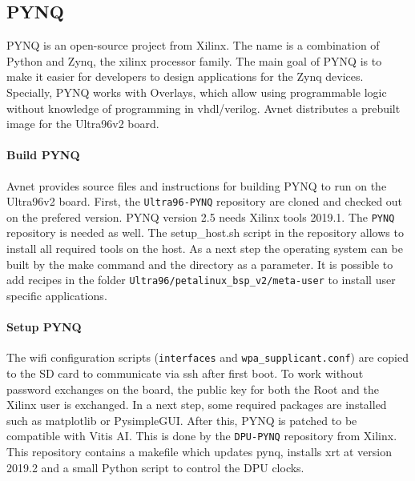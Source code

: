 \subsection{PYNQ}
\label{subsec:embedded_platform:operating_systems:pynq}

PYNQ is an open-source project from Xilinx.
The name is a combination of Python and Zynq, the xilinx processor family.
The main goal of PYNQ is to make it easier for developers to design applications for the Zynq devices. 
Specially, PYNQ works with Overlays, which allow using programmable logic without knowledge of programming in vhdl/verilog.
Avnet distributes a prebuilt image for the Ultra96v2 board.

\paragraph{Build PYNQ}
Avnet provides source files and instructions for building PYNQ to run on the Ultra96v2 board.
First, the \texttt{Ultra96-PYNQ} repository are cloned and checked out on the prefered version.
PYNQ version 2.5 needs Xilinx tools 2019.1.
The \texttt{PYNQ} repository is needed as well.
The setup\_host.sh script in the repository allows to install all required tools on the host.
As a next step the operating system can be built by the make command and the directory as a parameter.
It is possible to add recipes in the folder \texttt{Ultra96/petalinux\_bsp\_v2/meta-user} to install user specific applications. 

\paragraph{Setup PYNQ}
The wifi configuration scripts (\texttt{interfaces} and \texttt{wpa\_supplicant.conf}) are copied to the SD card to communicate via \acrfull{ssh} after first boot.
To work without password exchanges on the board, the public key for both the Root and the Xilinx user is exchanged.
In a next step, some required packages are installed such as matplotlib or PysimpleGUI.
After this, PYNQ is patched to be compatible with Vitis AI.
This is done by the \texttt{DPU-PYNQ} repository from Xilinx.
This repository contains a makefile which updates pynq, installs \acrfull{xrt} at version 2019.2 and a small Python script to control the DPU clocks.